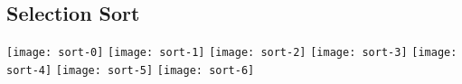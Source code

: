 \documentclass{article}
\begin{document}
\subsection{Selection Sort}
\texttt{[image: sort-0]}
\texttt{[image: sort-1]}
\texttt{[image: sort-2]}
\texttt{[image: sort-3]}
\texttt{[image: sort-4]}
\texttt{[image: sort-5]}
\texttt{[image: sort-6]}


\end{document}
